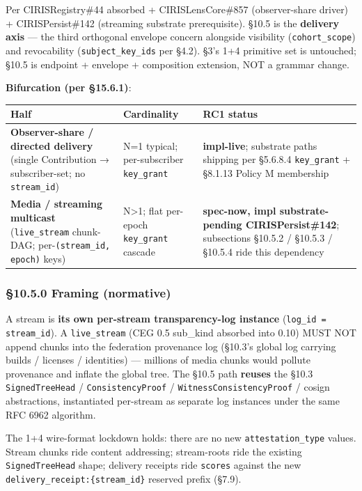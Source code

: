\documentclass[10pt]{article}
\begin{document}
Per CIRISRegistry\#44 absorbed + CIRISLensCore\#857 (observer-share driver) + CIRISPersist\#142 (streaming substrate prerequisite). §10.5 is the \textbf{delivery axis} — the third orthogonal envelope concern alongside visibility (\texttt{cohort\_scope}) and revocability (\texttt{subject\_key\_ids} per §4.2). §3's 1+4 primitive set is untouched; §10.5 is endpoint + envelope + composition extension, NOT a grammar change.


\textbf{Bifurcation (per §15.6.1)}:


{\footnotesize
\begin{longtable}{|p{5.33cm}|p{5.33cm}|p{5.33cm}|}\hline
\textbf{Half} & \textbf{Cardinality} & \textbf{RC1 status} \\ \hline\endhead
\textbf{Observer-share / directed delivery} (single Contribution → subscriber-set; no \texttt{stream\_id}) & N=1 typical; per-subscriber \texttt{key\_grant} & \textbf{impl-live}; substrate paths shipping per §5.6.8.4 \texttt{key\_grant} + §8.1.13 Policy M membership \\ \hline
\textbf{Media / streaming multicast} (\texttt{live\_stream} chunk-DAG; per-\texttt{(stream\_id, epoch)} keys) & N>1; flat per-epoch \texttt{key\_grant} cascade & \textbf{spec-now, impl substrate-pending CIRISPersist\#142}; subsections §10.5.2 / §10.5.3 / §10.5.4 ride this dependency \\ \hline
\end{longtable}}


\subsubsection*{§10.5.0 Framing (normative)}


A stream is \textbf{its own per-stream transparency-log instance} (\texttt{log\_id = stream\_id}). A \texttt{live\_stream} (CEG 0.5 sub\_kind absorbed into 0.10) MUST NOT append chunks into the federation provenance log (§10.3's global log carrying builds / licenses / identities) — millions of media chunks would pollute provenance and inflate the global tree. The §10.5 path \textbf{reuses} the §10.3 \texttt{SignedTreeHead} / \texttt{ConsistencyProof} / \texttt{WitnessConsistencyProof} / cosign abstractions, instantiated per-stream as separate log instances under the same RFC 6962 algorithm.


The 1+4 wire-format lockdown holds: there are no new \texttt{attestation\_type} values. Stream chunks ride content addressing; stream-roots ride the existing \texttt{SignedTreeHead} shape; delivery receipts ride \texttt{scores} against the new \texttt{delivery\_receipt:\{stream\_id\}} reserved prefix (§7.9).
\end{document}
